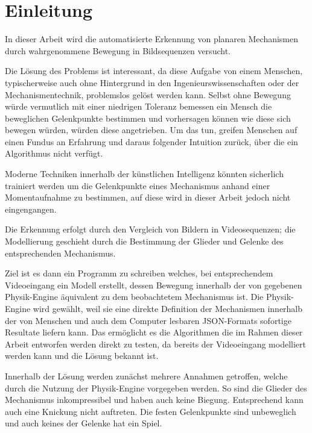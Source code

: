 %

\chapter{Einleitung}
\label{ch:einleitung}

In dieser Arbeit wird die automatisierte Erkennung von planaren Mechanismen durch wahrgenommene Bewegung in Bildsequenzen versucht.

Die Lösung des Problems ist interessant, da diese Aufgabe von einem Menschen, typischerweise auch ohne Hintergrund in den Ingenieurswissenschaften oder der Mechanismentechnik, problemslos gelöst werden kann.
Selbst ohne Bewegung würde vermutlich mit einer niedrigen Toleranz bemessen ein Mensch die beweglichen Gelenkpunkte bestimmen und vorhersagen können wie diese sich bewegen würden, würden diese angetrieben.
Um das tun, greifen Menschen auf einen Fundus an Erfahrung und daraus folgender Intuition zurück, über die ein Algorithmus nicht verfügt.

Moderne Techniken innerhalb der künstlichen Intelligenz könnten sicherlich trainiert werden um die Gelenkpunkte eines Mechanismus anhand einer Momentaufnahme zu bestimmen, auf diese wird in dieser Arbeit jedoch nicht eingengangen.

Die Erkennung erfolgt durch den Vergleich von Bildern in Videosequenzen; die Modellierung geschieht durch die Bestimmung der Glieder und Gelenke des entsprechenden Mechanismus.

Ziel ist es dann ein Programm zu schreiben welches, bei entsprechendem Videoeingang ein Modell erstellt, dessen Bewegung innerhalb der von  gegebenen Physik-Engine äquivalent zu dem beobachtetem Mechanismus ist.
Die  Physik-Engine wird gewählt, weil sie eine direkte Definition der Mechanismen innerhalb der von Menschen und auch dem Computer lesbaren JSON-Formats sofortige Resultate liefern kann.
Das ermöglicht es die Algorithmen die im Rahmen dieser Arbeit entworfen werden direkt zu testen, da bereits der Videoeingang modelliert werden kann und die Lösung bekannt ist.

Innerhalb der Lösung werden zunächst mehrere Annahmen getroffen, welche durch die Nutzung der Physik-Engine  vorgegeben werden.
So sind die Glieder des Mechanismus inkompressibel und haben auch keine Biegung.
Entsprechend kann auch eine Knickung nicht auftreten.
Die festen Gelenkpunkte sind unbeweglich und auch keines der Gelenke hat ein Spiel.

